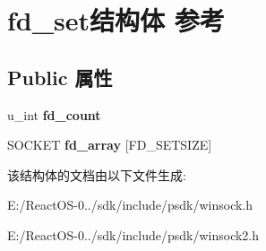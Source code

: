 \hypertarget{structfd__set}{}\section{fd\+\_\+set结构体 参考}
\label{structfd__set}
\subsection*{Public 属性}
\begin{DoxyCompactItemize}
\item 
\mbox{\label{structfd__set_a72f092cbed609cbc3f1d4f239e6cf149}} 
u\+\_\+int {\bfseries fd\+\_\+count}
\item 
\mbox{\label{structfd__set_abee35e6aefeeb9e7c3000955230a0315}} 
S\+O\+C\+K\+ET {\bfseries fd\+\_\+array} \mbox{[}F\+D\+\_\+\+S\+E\+T\+S\+I\+ZE\mbox{]}
\end{DoxyCompactItemize}


该结构体的文档由以下文件生成\+:\begin{DoxyCompactItemize}
\item 
E\+:/\+React\+O\+S-\/0../sdk/include/psdk/winsock.\+h\item 
E\+:/\+React\+O\+S-\/0../sdk/include/psdk/winsock2.\+h\end{DoxyCompactItemize}
